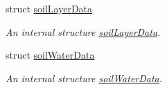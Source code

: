 \begin{DoxyCompactItemize}
struct \mbox{\hyperlink{struct_global_vars_1_1zone_specific_data_1_1soil_layer_data}{soil\+Layer\+Data}}
\begin{DoxyCompactList}\small\item\em An internal structure \mbox{\hyperlink{struct_global_vars_1_1zone_specific_data_1_1soil_layer_data}{soil\+Layer\+Data}}. \end{DoxyCompactList}\item 
struct \mbox{\hyperlink{struct_global_vars_1_1zone_specific_data_1_1soil_water_data}{soil\+Water\+Data}}
\begin{DoxyCompactList}\small\item\em An internal structure \mbox{\hyperlink{struct_global_vars_1_1zone_specific_data_1_1soil_water_data}{soil\+Water\+Data}}. \end{DoxyCompactList}\end{DoxyCompactItemize}
